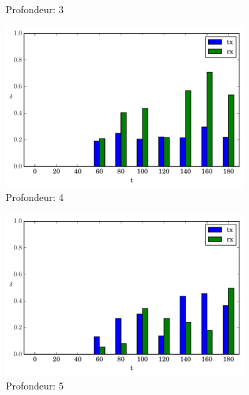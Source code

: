 \begin{figure}[h]
\begin{subfigure}{0.3\textwidth}
    \caption{Profondeur: 3}
    \label{supervision:fig:route_3}
  \end{subfigure}

  \begin{subfigure}{0.3\textwidth}
    \includegraphics[width=\textwidth]{img/evolution_route_4.pdf}
    \caption{Profondeur: 4}
    \label{supervision:fig:route_4}
  \end{subfigure}
  \begin{subfigure}{0.3\textwidth}
    \includegraphics[width=\textwidth]{img/evolution_route_5.pdf}
    \caption{Profondeur: 5}
    \label{supervision:fig:route_5}
  \end{subfigure}
  \begin{subfigure}{0.3\textwidth}

\end{subfigure}
\end{figure}
